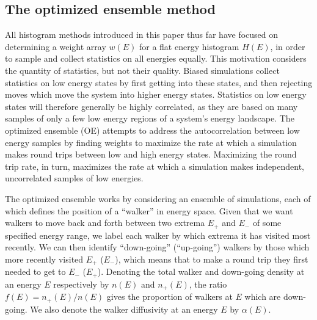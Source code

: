 \documentclass[11pt]{article}
\newcommand{\p}[1]{\left(#1\right)} %
\begin{document}
\subsection{The optimized ensemble method}
\label{sec:optimized_ensemble}

All histogram methods introduced in this paper thus far have focused
on determining a weight array $w\p{E}$ for a flat energy histogram
$H\p{E}$, in order to sample and collect statistics on all energies
equally. This motivation considers the quantity of statistics, but not
their quality. Biased simulations collect statistics on low energy
states by first getting into these states, and then rejecting moves
which move the system into higher energy states. Statistics on low
energy states will therefore generally be highly correlated, as they
are based on many samples of only a few low energy regions of a
system's energy landscape. The optimized ensemble
(OE)\cite{optimized_ensemble} attempts to address the autocorrelation
between low energy samples by finding weights to maximize the rate at
which a simulation makes round trips between low and high energy
states. Maximizing the round trip rate, in turn, maximizes the rate at
which a simulation makes independent, uncorrelated samples of low
energies.

The optimized ensemble works by considering an ensemble of
simulations, each of which defines the position of a ``walker'' in
energy space. Given that we want walkers to move back and forth
between two extrema $E_+$ and $E_-$ of some specified energy range, we
label each walker by which extrema it has visited most recently. We
can then identify ``down-going'' (``up-going'') walkers by those which
more recently visited $E_+$ ($E_-$), which means that to make a round
trip they first needed to get to $E_-$ ($E_+$). Denoting the total
walker and down-going density at an energy $E$ respectively by
$n\p{E}$ and $n_+\p{E}$, the ratio $f\p{E}=n_+\p{E}/n\p{E}$ gives the
proportion of walkers at $E$ which are down-going. We also denote the
walker diffusivity at an energy $E$ by $\alpha\p{E}$.
\end{document}

